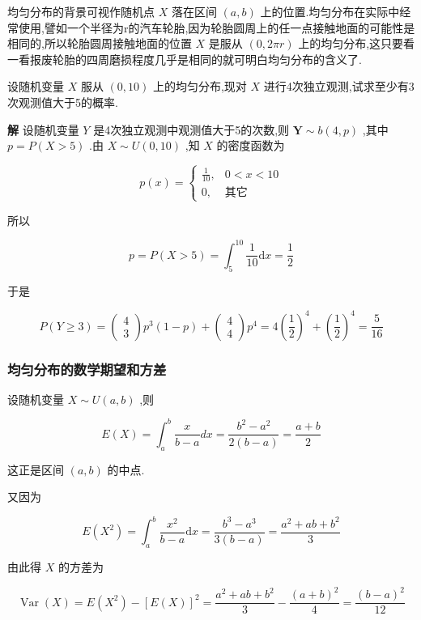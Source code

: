 均匀分布的背景可视作随机点 $ X $ 落在区间 $ (a,b) $ 上的位置.均匀分布在实际中经常使用,譬如一个半径为r的汽车轮胎,因为轮胎圆周上的任一点接触地面的可能性是相同的,所以轮胎圆周接触地面的位置 $ X $ 是服从 $ (0,2 \pi r) $ 上的均匀分布,这只要看一看报废轮胎的四周磨损程度几乎是相同的就可明白均匀分布的含义了.

\begin{example}
	设随机变量 $ X $ 服从 $ (0,10) $ 上的均匀分布,现对 $ X $ 进行4次独立观测,试求至少有3次观测值大于5的概率.
	
	\textbf{解} 设随机变量 $ Y $ 是4次独立观测中观测值大于5的次数,则 $ \mathbf{Y} \sim b(4, p) $ ,其中 $ p=P(X>5) $ .由 $ X \sim U(0,10) $ ,知 $ X $ 的密度函数为
	
	\[
	p(x)=\left\{
	\begin{array}{ll}
	{\frac{1}{10},} & {0<x<10} \\ 
	{0,}            & {\text{其它}}
	\end{array}\right.
	\]
	
	所以
	
	\[
	p=P(X>5)=\int_{5}^{10} \frac{1}{10} \mathrm{d} x=\frac{1}{2}
	\]
	
	于是
	
	\[
	P(Y \geqslant 3)=\left( \begin{array}{l}{4} \\ {3}\end{array}\right) p^{3}(1-p)+\left( \begin{array}{l}{4} \\ {4}\end{array}\right) p^{4}=4\left(\frac{1}{2}\right)^{4}+\left(\frac{1}{2}\right)^{4}=\frac{5}{16}
	\]
\end{example}

\subsubsection{均匀分布的数学期望和方差}

设随机变量 $ X \sim U(a, b) $ ,则

\[
E(X)=\int_{a}^{b} \frac{x}{b-a} d x=\frac{b^{2}-a^{2}}{2(b-a)}=\frac{a+b}{2}
\]

这正是区间 $ (a,b) $ 的中点.

又因为

\[
E\left(X^{2}\right)=\int_{a}^{b} \frac{x^{2}}{b-a} \mathrm{d} x=\frac{b^{3}-a^{3}}{3(b-a)}=\frac{a^{2}+a b+b^{2}}{3}
\]

由此得 $ X $ 的方差为

\[
\operatorname{Var}(X)=E\left(X^{2}\right)-[E(X)]^{2}=\frac{a^{2}+a b+b^{2}}{3}-\frac{(a+b)^{2}}{4}=\frac{(b-a)^{2}}{12}
\]

